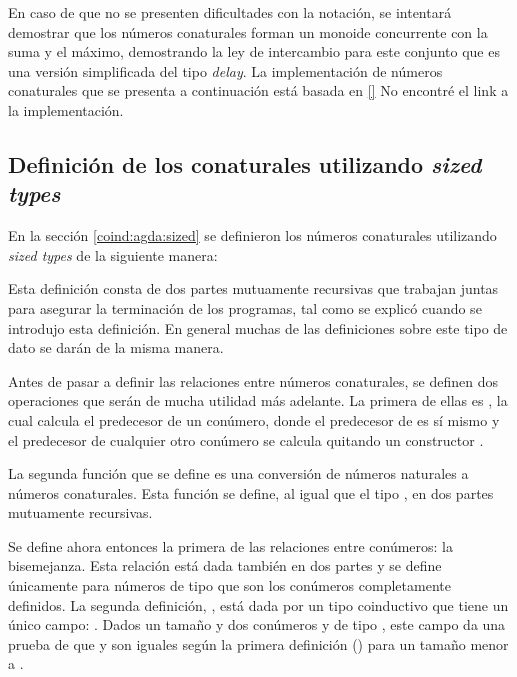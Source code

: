 En caso de que no se presenten dificultades con la notación, se intentará demostrar que los números conaturales forman un monoide concurrente con la suma y el máximo, demostrando la ley de intercambio para este conjunto que es una versión simplificada del tipo \textit{delay}. La implementación de números conaturales que se presenta a continuación está basada en \ref{} {\color{red} No encontré el link a la implementación}.

\subsection{Definición de los conaturales utilizando \textit{sized types}}\label{casodelay:sized:def}

En la sección \ref{coind:agda:sized} se definieron los números conaturales utilizando \textit{sized types} de la siguiente manera:

Esta definición consta de dos partes mutuamente recursivas que trabajan juntas para asegurar la terminación de los programas, tal como se explicó cuando se introdujo esta definición. En general muchas de las definiciones sobre este tipo de dato se darán de la misma manera. 

Antes de pasar a definir las relaciones entre números conaturales, se definen dos operaciones que serán de mucha utilidad más adelante. La primera de ellas es , la cual calcula el predecesor de un conúmero, donde el predecesor de  es sí mismo y el predecesor de cualquier otro conúmero se calcula quitando un constructor .

La segunda función que se define es una conversión de números naturales a números conaturales. Esta función se define, al igual que el tipo , en dos partes mutuamente recursivas.

Se define ahora entonces la primera de las relaciones entre conúmeros: la bisemejanza. Esta relación está dada también en dos partes y se define únicamente para números de tipo  que son los conúmeros completamente definidos. La segunda definición, , está dada por un tipo  coinductivo que tiene un único campo: . Dados un tamaño  y dos conúmeros  y  de tipo , este campo da una prueba de que  y  son iguales según la primera definición (\AgdaFunction{$[\_]\_\sim\_$}) para un tamaño  menor a . 

